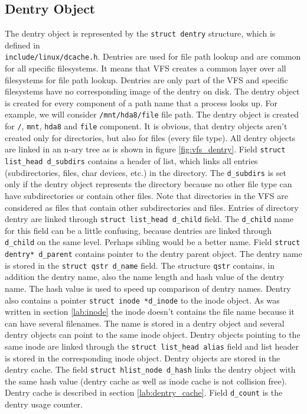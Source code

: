 \subsection{Dentry Object}
\label{lab:dentry}
The dentry object is represented by the \texttt{struct dentry} structure, which is defined
in\\ \texttt{include/linux/dcache.h}. Dentries are used for file path
lookup and are common for all specific filesystems. It means that VFS creates
a common layer over all filesystems for file path lookup. Dentries
are only part of the VFS and specific filesystems have no corresponding image of
the
dentry on disk. The dentry object is created for every component of a path name that a
process looks up. For example, we will consider \texttt{/mnt/hda8/file} file path.
The dentry object is created for \texttt{/}, \texttt{mnt}, \texttt{hda8} and \texttt{file}
component. It is obvious, that dentry objects aren't created only for directories, but
also for files (every file type). All dentry objects are linked in an n-ary tree as is
shown in figure \ref{fig:vfs_dentry}. Field \texttt{struct list\_head d\_subdirs}
contains a header of list, which links all entries (subdirectories, files, char devices,
etc.) in the directory. The \texttt{d\_subdirs} is set only if the dentry object
represents the directory because no other file type can have subdirectories or contain
other files. Note that directories in the VFS are considered as files that contain
other subdirectories and files. Entries of directory dentry are linked through
\texttt{struct list\_head d\_child} field. The \texttt{d\_child} name for this field
can be a little confusing, because dentries are linked through \texttt{d\_child} on
the same level. Perhaps sibling would be a better name. Field \texttt{struct dentry*
d\_parent} contains pointer to the dentry parent object. The dentry name is stored in the
\texttt{struct qstr d\_name} field. The structure \texttt{qstr} contains, in addition the dentry
name, also the name length and hash value of the dentry name. The hash value is used
to speed up comparison of dentry names. Dentry also contains a pointer \texttt{struct
inode *d\_inode} to the inode object. As was written in section \ref{lab:inode} the inode
doesn't contains the file name because it can have several filenames. The name is stored
in a dentry object and several dentry objects can point to the same inode object.
Dentry objects pointing to the same inode are linked through the \texttt{struct
list\_head alias} field and list header is stored in the corresponding inode object.
Dentry objects are stored in the dentry cache. The field \texttt{struct hlist\_node
d\_hash} links the dentry object with the same hash value (dentry cache as well as
inode cache is not collision free). Dentry cache is described in section
\ref{lab:dentry_cache}. Field \texttt{d\_count} is the dentry usage counter.

